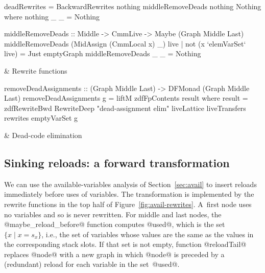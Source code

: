 \documentclass[blockstyle,preprint,nocopyrightspace]{sigplanconf}
\newcommand\slotof[1]{\ensuremath{s_{#1}}}
\newcommand{\authornote}[1]{{\em #1}}
\def\authornote#1{\unskip\relax}
\newcommand{\simon}[1]{\authornote{SLPJ: #1}}
\newcommand\secref[1]{Section~\ref{sec:#1}}
\newcommand\seclabel[1]{\label{sec:#1}}
\newcommand\figref[1]{Figure~\ref{fig:#1}}
\newcommand\figlabel[1]{\label{fig:#1}}
\begin{document}
\begin{figure*}
\begin{codetable}
\T\begin{code}
deadRewrites = BackwardRewrites nothing middleRemoveDeads nothing Nothing
  where nothing _ _ = Nothing

middleRemoveDeads :: Middle -> CmmLive -> Maybe (Graph Middle Last)
middleRemoveDeads (MidAssign (CmmLocal x) _) live
    | not (x `elemVarSet` live) = Just emptyGraph
middleRemoveDeads _ _ = Nothing
\end{code}\B
& Rewrite \mbox{functions}\\
\hline

\T\begin{code}
removeDeadAssignments :: (Graph Middle Last) -> DFMonad (Graph Middle Last)
removeDeadAssignments g = liftM zdfFpContents result
     where result = zdfRewriteBwd RewriteDeep "dead-assignment elim"
                                  liveLattice liveTransfers rewrites emptyVarSet g
\end{code}%
& \mbox{Dead-code} elimination\\
\end{codetable}
\caption{Dead-assignment elimination, which relies on the analysis of
\figref{liveness}} 
\figlabel{dead-elim}
\end{figure*}


\subsection{Sinking reloads: a forward transformation}
\simon{Backward reference needed to ``Pass 2 of the algorithm described
in the preamble to Section 4''}

\simon{I believe that in fact we never make the call to @zdfSolveFwd@ given 
in Figure 3?  Instead we pass the transfer functions @avails\_reloads\_transfer@
to @zdfRewriteFwd@?  Whose call is not given in Figure 6. Perhpas we should give
the latter call, and point out that the call in Figure 3 is illustrative and
is not in fact used?}

\simon{Incidentally, I wonder if we should
use record notation when constructing @ForwardRewrites@?}

\seclabel{sink-reloads}

We can use the available-variables analysis of \secref{avail} to
insert reloads
immediately before uses of variables.
The transformation is implemented by the rewrite functions in the top
half of \figref{avail-rewrites}.
A~first node uses no variables and so is never rewritten.
For middle and last nodes, the @maybe_reload_before@ function
computes @used@, which is the set $\{ x \mid x = \slotof x\}$, i.e., 
the set of variables whose values are the same as the values in the
corresponding stack slots.
If that set is not empty, function
@reloadTail@ replaces @node@ with a new graph in which @node@ is
preceded by a (redundant) reload for each variable in the set~@used@.
\end{document}
